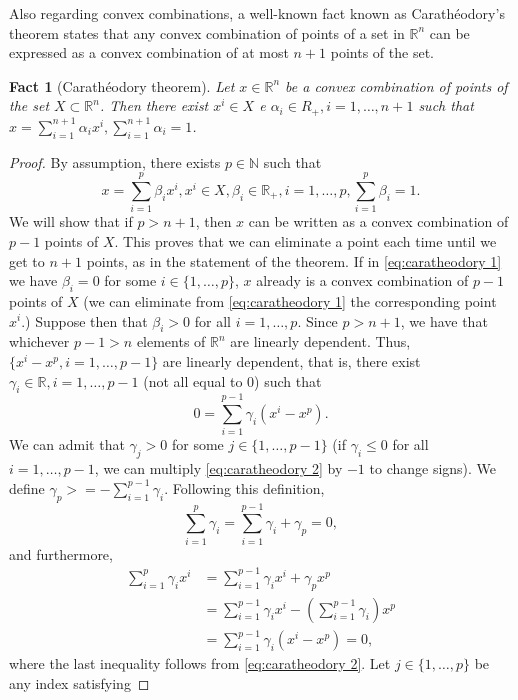 \documentclass[smallextended,numbook,nospthms]{svjour3}
\theoremstyle{plain}
\newtheorem{fact}[theorem]{Fact}
\theoremstyle{definition}
\def\RR{\mathds R}
\def\NN{\mathds N}
\begin{document}
Also regarding convex combinations, a well-known fact known as Carathéodory's theorem states that any convex combination of points of a set in $\RR^{n}$ can be expressed as a convex combination of at most $n+1$ points of the set.
\begin{fact}[Carathéodory theorem]\label{fact:caratheodory}
Let $x \in \RR^{n}$ be a convex combination of points of the set $X \subset \RR^{n}$. Then there exist $x^{i} \in X$ e $\alpha_{i} \in R_{+}, i=1, \ldots, n+1$
such that $x=\sum_{i=1}^{n+1} \alpha_{i} x^{i}, \sum_{i=1}^{n+1} \alpha_{i}=1$.
\end{fact}
\begin{proof}
	By assumption, there exists $p \in \NN$ such that
	\[
	x=\sum_{i=1}^{p} \beta_{i} x^{i}, x^{i} \in X, \beta_{i} \in \RR_{+}, i=1, \ldots, p, \sum_{i=1}^{p} \beta_{i}=1. \label{eq:caratheodory 1}
	\]
	We will show that if $p > n+1$, then $x$ can be written as a convex combination of $p-1$ points of $X$. This proves that we can eliminate a point each time until we get to $n+1$ points, as in the statement of the theorem.
	If in \cref{eq:caratheodory 1} we have $\beta_{i}=0$ for some $i \in \{1,\ldots,p\}$, $x$ already is a convex combination of $p-1$ points of $X$ (we can eliminate from \cref{eq:caratheodory 1} the corresponding point $x^i$.) Suppose then that $\beta_{i}>0$ for all $i=1,\ldots,p$. Since $p>n+1$, we have that whichever $p-1>n$ elements of $\RR^n$ are linearly dependent. Thus, $\{x^i-x^p, i =1,\ldots,p-1\}$ are linearly dependent, that is, there exist $\gamma_{i} \in \RR, i=1,\ldots,p-1$ (not all equal to 0) such that
	\[
	0=\sum_{i=1}^{p-1} \gamma_{i}\left(x^{i}-x^{p}\right) \label{eq:caratheodory 2}.
	\]
	We can admit that $\gamma_{j}>0$ for some $j \in\{1, \ldots, p-1\}$ (if $\gamma_{i} \leq 0$ for all $i=1, \ldots, p-1$, we can multiply \cref{eq:caratheodory 2} by $-1$ to change signs). We define $\gamma_{p}>=-\sum_{i=1}^{p-1} \gamma_{i}$. Following this definition,
	\[
	\sum_{i=1}^{p} \gamma_{i}=\sum_{i=1}^{p-1} \gamma_{i}+\gamma_{p}=0, \label{eq:caratheodory 3}
	\]
	and furthermore,
	\begin{align}
		\sum_{i=1}^{p} \gamma_{i} x^{i} &=\sum_{i=1}^{p-1} \gamma_{i} x^{i}+\gamma_{p} x^{p} \\
		&=\sum_{i=1}^{p-1} \gamma_{i} x^{i}-\left(\sum_{i=1}^{p-1} \gamma_{i}\right) x^{p} \\
		&=\sum_{i=1}^{p-1} \gamma_{i}\left(x^{i}-x^{p}\right)=0, \label{eq:caratheodory 4}
	\end{align}
	where the last inequality follows from \cref{eq:caratheodory 2}. Let $j \in\{1, \ldots, p\}$ be any index satisfying

\end{proof}
\end{document}
